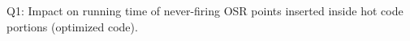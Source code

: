 \label{fig:osr-code-quality-O1} Q1: Impact on running time of never-firing OSR points inserted inside hot code portions (optimized code).



